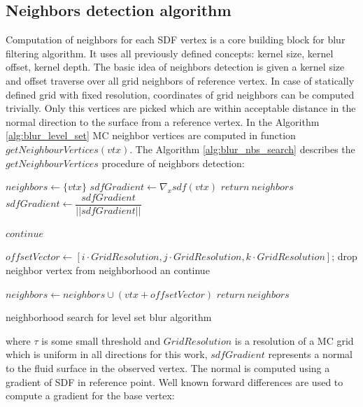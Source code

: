  \subsection{Neighbors detection algorithm}
Computation of neighbors for each SDF vertex is a core building block for blur filtering algorithm. It uses all previously defined concepts: kernel size, kernel offset, kernel depth. The basic idea of neighbors detection is given a kernel size and offset traverse over all grid neighbors of reference vertex. In case of statically defined grid with fixed resolution, coordinates of grid neighbors can be computed trivially. Only this vertices are picked which are within acceptable distance in the  normal direction to the surface from a reference vertex.
In the Algorithm \ref{alg:blur_level_set} MC neighbor vertices are computed in function $getNeighbourVertices(vtx)$. The Algorithm \ref{alg:blur_nbs_search} describes the $getNeighbourVertices$ procedure of neighbors detection:
\begin{algorithm}[H]
	\scriptsize
	\begin{algorithmic}
		\State $neighbors \gets \{vtx\}$
		\State $sdfGradient \gets \nabla_x sdf(vtx)$
			\State $return\ neighbors$
		\EndIf
		\State $sdfGradient \gets \dfrac{sdfGradient}{||sdfGradient||}$
		
						\State $continue$
					\EndIf
					
					\State $offsetVector \gets [i \cdot GridResolution, j \cdot GridResolution, k \cdot GridResolution]$;
						\State drop neighbor vertex from neighborhood an continue
					\EndIf
					
					\State $neighbors \gets neighbors \cup (vtx + offsetVector)$
				\EndFor
			\EndFor
		\EndFor
		\State $return\ neighbors$
	\end{algorithmic}
	\caption{neighborhood search for level set blur algorithm}
	\label{alg:blur_nbs_search}
\end{algorithm}
where $\tau$ is some small threshold and $GridResolution$ is a resolution of a MC grid which is uniform in all directions for this work, $sdfGradient$ represents a normal to the fluid surface in the observed vertex. The normal is computed using a gradient of SDF in reference point. Well known forward differences are used to compute a gradient for the base vertex:
